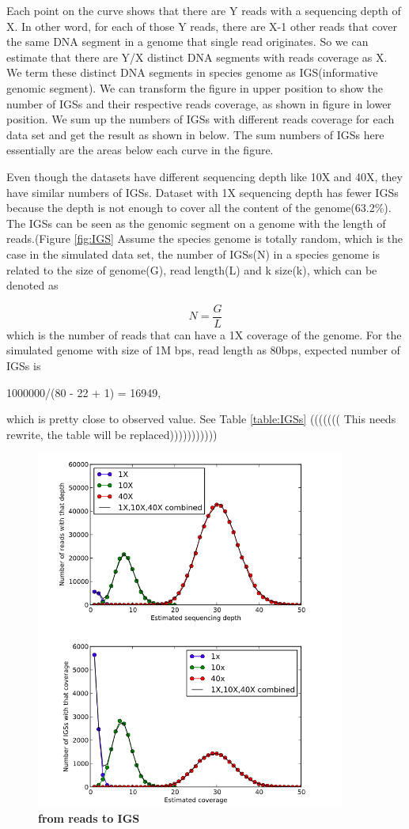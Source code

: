 Each point on the curve shows that there are Y reads with a sequencing depth of
 X. In other word, for each of those Y reads, there are X-1 other reads that 
cover the same DNA segment in a genome that single read originates. So we can 
estimate that there are Y/X distinct DNA segments with reads coverage as X. 
We term these distinct DNA segments in species genome as 
IGS(informative genomic segment). We can transform the figure in upper 
position to show the number of IGSs and their respective reads coverage, as 
shown in figure in lower position. We sum up the numbers of IGSs with 
different reads coverage for each data set and get the result as shown in 
below. The sum numbers of IGSs here essentially are the areas below each curve 
in the figure.

Even though the datasets have different sequencing depth like 10X and 40X, 
they have similar numbers of IGSs. Dataset with 1X sequencing depth has fewer 
IGSs because the depth is not enough to cover all the content of the 
genome(63.2\%). The IGSs can be seen as the
genomic segment on a genome with the length of reads.(Figure \ref{fig:IGS}  
Assume the species 
genome is totally random, which is the case in the simulated data set, the 
number of IGSs(N) in a species genome is related to the size of genome(G), 
read length(L) and k size(k), which can be denoted as

\[N =\frac{G}{L}  \]
which is the number of reads that can have a 1X coverage of the genome.
For the simulated genome with size of 1M bps, read length as 80bps, expected 
number of IGSs is 

1000000/(80 - 22 + 1) = 16949, 

which is pretty close to observed value. See Table \ref{table:IGSs}
((((((( This needs rewrite, the table will be replaced)))))))))))

\begin{figure}[!ht]
\centerline{\includegraphics[width=4in]{./figures/from_reads_to_IGS.png}}
\caption{\bf from reads to IGS}
\label{fig:reads_to_IGS}
\end{figure}

